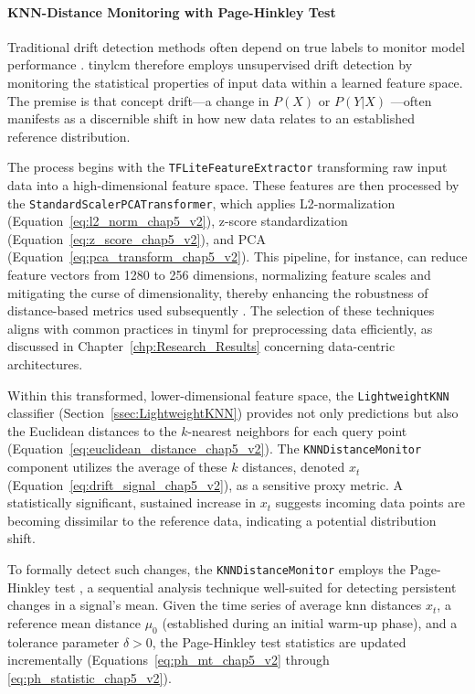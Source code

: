 \paragraph{KNN-Distance Monitoring with Page-Hinkley Test}
Traditional drift detection methods often depend on true labels to monitor model performance \cite{disabatoTinyMachineLearning2024, pavanTyBoxAutomaticDesign2024}. \gls{tinylcm} therefore employs unsupervised drift detection by monitoring the statistical properties of input data within a learned feature space. The premise is that concept drift—a change in $P(X)$ or $P(Y|X)$ \cite{gamaSurveyConceptDrift2014}—often manifests as a discernible shift in how new data relates to an established reference distribution.

The process begins with the \texttt{TFLiteFeatureExtractor} transforming raw input data into a high-dimensional feature space. These features are then processed by the \texttt{StandardScalerPCATransformer}, which applies L2-normalization (Equation~\ref{eq:l2_norm_chap5_v2}), z-score standardization (Equation~\ref{eq:z_score_chap5_v2}), and PCA (Equation~\ref{eq:pca_transform_chap5_v2}). This pipeline, for instance, can reduce feature vectors from 1280 to 256 dimensions, normalizing feature scales and mitigating the curse of dimensionality, thereby enhancing the robustness of distance-based metrics used subsequently \cite{jolliffePrincipalComponentAnalysis2016}. The selection of these techniques aligns with common practices in \gls{tinyml} for preprocessing data efficiently, as discussed in Chapter~\ref{chp:Research_Results} concerning data-centric architectures.

Within this transformed, lower-dimensional feature space, the \texttt{LightweightKNN} classifier (Section~\ref{ssec:LightweightKNN}) provides not only predictions but also the Euclidean distances to the $k$-nearest neighbors for each query point (Equation~\ref{eq:euclidean_distance_chap5_v2}). The \texttt{KNNDistanceMonitor} component utilizes the average of these $k$ distances, denoted $x_t$ (Equation~\ref{eq:drift_signal_chap5_v2}), as a sensitive proxy metric. A statistically significant, sustained increase in $x_t$ suggests incoming data points are becoming dissimilar to the reference data, indicating a potential distribution shift.

To formally detect such changes, the \texttt{KNNDistanceMonitor} employs the Page-Hinkley test \cite{pageContinuousInspectionSchemes1954}, a sequential analysis technique well-suited for detecting persistent changes in a signal's mean. Given the time series of average \gls{knn} distances $x_t$, a reference mean distance $\mu_0$ (established during an initial warm-up phase), and a tolerance parameter $\delta > 0$, the Page-Hinkley test statistics are updated incrementally (Equations~\ref{eq:ph_mt_chap5_v2} through \ref{eq:ph_statistic_chap5_v2}).

